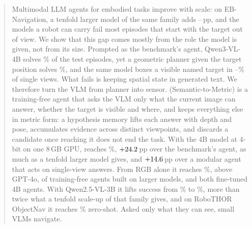 \begin{abstract}
Multimodal LLM agents for embodied tasks improve with scale: on EB-Navigation, a tenfold larger model of the same
family adds \nScaleQwen--\nScaleIntern\,pp, and the models a robot can carry fail most episodes that start with the
target out of view. We show that this gap comes mostly from the role the model is given, not from its size. Prompted
as the benchmark's agent, Qwen3-VL-4B solves \nEBThree\% of the test episodes, yet a geometric planner given the
target position solves \nOracle\%, and the same model boxes a visible named target in
\nProbeThreeCommon--\nProbeThreeBase\% of single views. What fails is keeping spatial state in generated text. We
therefore turn the VLM from planner into sensor. \ours (Semantic-to-Metric) is a training-free agent that asks the VLM
only what the current image can answer, whether the target is visible and where, and keeps everything else in metric
form: a hypothesis memory lifts each answer with depth and pose, accumulates evidence across distinct viewpoints, and
discards a candidate once reaching it does not end the task. With the 4B model at 4-bit on one 8\,GB GPU, \ours
reaches \nSThree\%, ${+}\nGainThree$\,pp over the benchmark's agent, as much as a tenfold larger model gives, and
${+}\nSOverMod$\,pp over a modular agent that acts on single-view answers. From RGB alone it reaches \nRGBThree\%,
above GPT-4o, \nNTrainFreeBelowRGB{} of \nNTrainFree{} training-free agents built on larger models, and both
fine-tuned 4B agents. With Qwen2.5-VL-3B it lifts success from \nEBTwo\% to \nSTwo\%, more than twice what a tenfold
scale-up of that family gives, and on RoboTHOR ObjectNav it reaches \nRoboSR\% zero-shot. Asked only what they
can see, small VLMs navigate.
\end{abstract}
